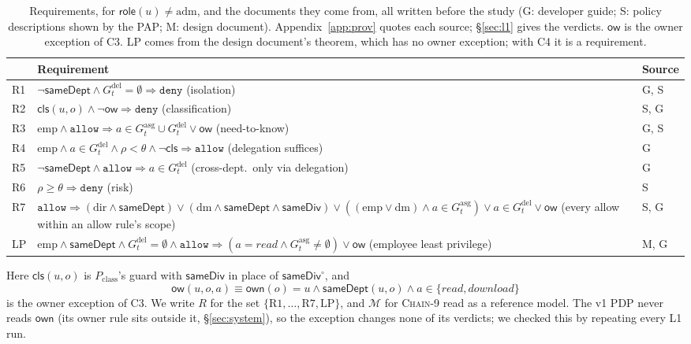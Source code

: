 \documentclass[sigconf,review,anonymous]{acmart}
\newcommand{\chain}{\textsc{Chain-9}\xspace}
\newcommand{\Pc}{P_{\mathrm{class}}}
\newcommand{\ow}{\mathsf{ow}}
\newcommand{\Gasg}{G^{\mathrm{asg}}}
\newcommand{\Gdel}{G^{\mathrm{del}}}
\newcommand{\sameDept}{\mathsf{sameDept}}
\newcommand{\sameDiv}{\mathsf{sameDiv}}
\newcommand{\role}{\mathsf{role}}
\newcommand{\allowv}{\mathtt{allow}}
\newcommand{\denyv}{\mathtt{deny}}
\newcommand{\emp}{\mathrm{emp}}
\begin{document}
\begin{table}[t]
\caption{Requirements, for $\role(u)\neq\mathrm{adm}$, and the documents they come from, all written before the
study (G: developer guide; S: policy descriptions shown by the PAP; M: design document). Appendix~\ref{app:prov}
quotes each source; \S\ref{sec:l1} gives the verdicts. $\ow$ is the owner exception of C3. LP comes from the
design document's theorem, which has no owner exception; with C4 it is a requirement.}
\label{tab:req}
\small
\begin{tabularx}{\columnwidth}{@{}l@{\;}>{\raggedright\arraybackslash}X@{\;}l@{}}
\toprule
 & Requirement & Source \\
\midrule
R1 & $\neg\sameDept\wedge\Gdel_t=\emptyset\Rightarrow\denyv$ (isolation) & G, S \\
R2 & $\mathsf{cls}(u,o)\wedge\neg\ow\Rightarrow\denyv$ (classification) & S, G \\
R3 & $\emp\wedge\allowv\Rightarrow a\in\Gasg_t\cup\Gdel_t\vee\ow$ (need-to-know) & G, S \\
R4 & $\emp\wedge a\in\Gdel_t\wedge\rho<\theta\wedge\neg\mathsf{cls}\Rightarrow\allowv$ (delegation suffices) & G \\
R5 & $\neg\sameDept\wedge\allowv\Rightarrow a\in\Gdel_t$ (cross-dept.\ only via delegation) & G \\
R6 & $\rho\ge\theta\Rightarrow\denyv$ (risk) & S \\
R7 & $\allowv\Rightarrow(\mathrm{dir}\wedge\sameDept)\vee(\mathrm{dm}\wedge\sameDept\wedge\sameDiv)\vee((\emp\vee\mathrm{dm})\wedge a\in\Gasg_t)\vee a\in\Gdel_t\vee\ow$ (every allow within an allow rule's scope) & S, G \\
\midrule
LP & $\emp\wedge\sameDept\wedge\Gdel_t=\emptyset\wedge\allowv\Rightarrow(a=\mathit{read}\wedge\Gasg_t\neq\emptyset)\vee\ow$ (employee least privilege) & M, G \\
\bottomrule
\end{tabularx}
\end{table}

Here $\mathsf{cls}(u,o)$ is $\Pc$'s guard with $\sameDiv$ in place of $\sameDiv^\circ$, and
\[
\ow(u,o,a)\equiv\mathsf{own}(o)=u\wedge\sameDept(u,o)\wedge a\in\{\mathit{read},\mathit{download}\}
\]
is the owner exception of C3. We write $R$ for the set $\{\mathrm{R1},\dots,\mathrm{R7},\mathrm{LP}\}$, and $\mathcal{M}$ for
\chain read as a reference model. The v1 PDP never reads $\mathsf{own}$ (its owner rule sits outside it,
\S\ref{sec:system}), so the exception changes none of its verdicts; we checked this by repeating every L1 run.
\end{document}
